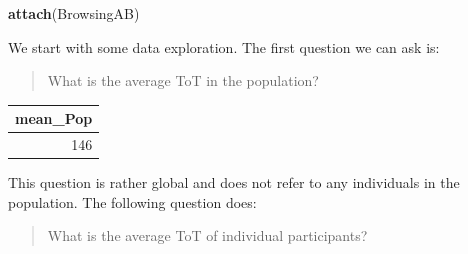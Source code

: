 \documentclass[]{svmono}
\newenvironment{Shaded}{\begin{snugshade}}{\end{snugshade}}
\newcommand{\KeywordTok}[1]{\textcolor[rgb]{0.13,0.29,0.53}{\textbf{#1}}}
\newcommand{\DataTypeTok}[1]{\textcolor[rgb]{0.13,0.29,0.53}{#1}}
\newcommand{\DecValTok}[1]{\textcolor[rgb]{0.00,0.00,0.81}{#1}}
\newcommand{\StringTok}[1]{\textcolor[rgb]{0.31,0.60,0.02}{#1}}
\newcommand{\OperatorTok}[1]{\textcolor[rgb]{0.81,0.36,0.00}{\textbf{#1}}}
\newcommand{\NormalTok}[1]{#1}
\theoremstyle{definition}
\theoremstyle{definition}
\theoremstyle{definition}
\theoremstyle{remark}
\begin{document}
\begin{Shaded}
\begin{Highlighting}[]
\KeywordTok{attach}\NormalTok{(BrowsingAB)}
\end{Highlighting}
\end{Shaded}

\begin{Shaded}
\end{Shaded}

We start with some data exploration. The first question we can ask is:

\begin{quote}
What is the average ToT in the population?
\end{quote}

\begin{Shaded}
\end{Shaded}

\begin{tabular}{r}
\hline
mean\_Pop\\
\hline
146\\
\hline
\end{tabular}

This question is rather global and does not refer to any individuals in
the population. The following question does:

\begin{quote}
What is the average ToT of individual participants?
\end{quote}

\begin{Shaded}
\end{Shaded}
\end{document}
